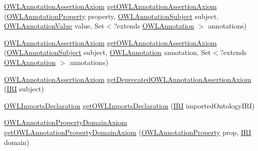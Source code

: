 \begin{DoxyCompactItemize}
\hyperlink{interfaceorg_1_1semanticweb_1_1owlapi_1_1model_1_1_o_w_l_annotation_assertion_axiom}{O\-W\-L\-Annotation\-Assertion\-Axiom} \hyperlink{interfaceorg_1_1semanticweb_1_1owlapi_1_1model_1_1_o_w_l_data_factory_a6117970cab998771584b29609b322777}{get\-O\-W\-L\-Annotation\-Assertion\-Axiom} (\hyperlink{interfaceorg_1_1semanticweb_1_1owlapi_1_1model_1_1_o_w_l_annotation_property}{O\-W\-L\-Annotation\-Property} property, \hyperlink{interfaceorg_1_1semanticweb_1_1owlapi_1_1model_1_1_o_w_l_annotation_subject}{O\-W\-L\-Annotation\-Subject} subject, \hyperlink{interfaceorg_1_1semanticweb_1_1owlapi_1_1model_1_1_o_w_l_annotation_value}{O\-W\-L\-Annotation\-Value} value, Set$<$?extends \hyperlink{interfaceorg_1_1semanticweb_1_1owlapi_1_1model_1_1_o_w_l_annotation}{O\-W\-L\-Annotation} $>$ annotations)
\item 
\hyperlink{interfaceorg_1_1semanticweb_1_1owlapi_1_1model_1_1_o_w_l_annotation_assertion_axiom}{O\-W\-L\-Annotation\-Assertion\-Axiom} \hyperlink{interfaceorg_1_1semanticweb_1_1owlapi_1_1model_1_1_o_w_l_data_factory_acccec76fc80278d2bec5e4354773d20f}{get\-O\-W\-L\-Annotation\-Assertion\-Axiom} (\hyperlink{interfaceorg_1_1semanticweb_1_1owlapi_1_1model_1_1_o_w_l_annotation_subject}{O\-W\-L\-Annotation\-Subject} subject, \hyperlink{interfaceorg_1_1semanticweb_1_1owlapi_1_1model_1_1_o_w_l_annotation}{O\-W\-L\-Annotation} annotation, Set$<$?extends \hyperlink{interfaceorg_1_1semanticweb_1_1owlapi_1_1model_1_1_o_w_l_annotation}{O\-W\-L\-Annotation} $>$ annotations)
\item 
\hyperlink{interfaceorg_1_1semanticweb_1_1owlapi_1_1model_1_1_o_w_l_annotation_assertion_axiom}{O\-W\-L\-Annotation\-Assertion\-Axiom} \hyperlink{interfaceorg_1_1semanticweb_1_1owlapi_1_1model_1_1_o_w_l_data_factory_a11dc8c1bf988eae36a5365b68ddf288f}{get\-Deprecated\-O\-W\-L\-Annotation\-Assertion\-Axiom} (\hyperlink{classorg_1_1semanticweb_1_1owlapi_1_1model_1_1_i_r_i}{I\-R\-I} subject)
\item 
\hyperlink{interfaceorg_1_1semanticweb_1_1owlapi_1_1model_1_1_o_w_l_imports_declaration}{O\-W\-L\-Imports\-Declaration} \hyperlink{interfaceorg_1_1semanticweb_1_1owlapi_1_1model_1_1_o_w_l_data_factory_a1dbeac60f80ce413cb52b84cd32a32a9}{get\-O\-W\-L\-Imports\-Declaration} (\hyperlink{classorg_1_1semanticweb_1_1owlapi_1_1model_1_1_i_r_i}{I\-R\-I} imported\-Ontology\-I\-R\-I)
\item 
\hyperlink{interfaceorg_1_1semanticweb_1_1owlapi_1_1model_1_1_o_w_l_annotation_property_domain_axiom}{O\-W\-L\-Annotation\-Property\-Domain\-Axiom} \hyperlink{interfaceorg_1_1semanticweb_1_1owlapi_1_1model_1_1_o_w_l_data_factory_af5d774d5f6888c8c305fc080b7cce1c5}{get\-O\-W\-L\-Annotation\-Property\-Domain\-Axiom} (\hyperlink{interfaceorg_1_1semanticweb_1_1owlapi_1_1model_1_1_o_w_l_annotation_property}{O\-W\-L\-Annotation\-Property} prop, \hyperlink{classorg_1_1semanticweb_1_1owlapi_1_1model_1_1_i_r_i}{I\-R\-I} domain)

\end{DoxyCompactItemize}
